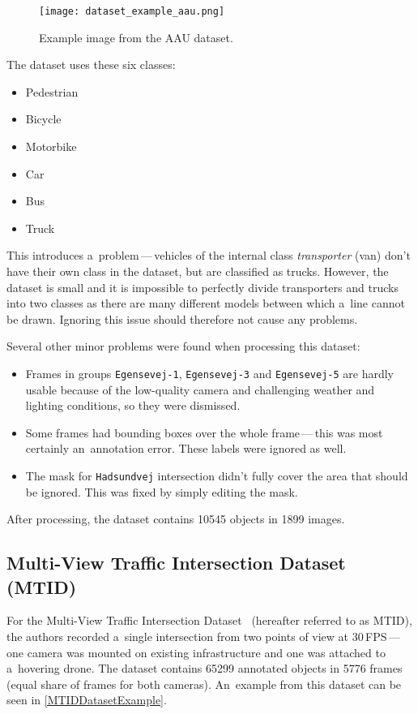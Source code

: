 \begin{figure}[t]
    \centering
    \texttt{[image: dataset\_example\_aau.png]}
    \captionsetup{width=0.7\textwidth}
    \caption{Example image from the AAU dataset.}
    \label{AAUDatasetExample}
\end{figure}

The dataset uses these six classes:
\begin{itemize}
    \item Pedestrian
    \item Bicycle
    \item Motorbike
    \item Car
    \item Bus
    \item Truck
\end{itemize}
This introduces a~problem\,---\,vehicles of the internal class \textit{transporter}
(van) don't have their own class in the dataset, but are classified as trucks.
However, the dataset is small and it is impossible to perfectly divide
transporters and trucks into two classes as there are many different models
between which a~line cannot be drawn.  Ignoring this issue should therefore not
cause any problems.

Several other minor problems were found when processing this dataset:
\begin{itemize}
    \item Frames in groups \verb|Egensevej-1|, \verb|Egensevej-3| and
    \verb|Egensevej-5| are hardly usable because of the low-quality camera and
    challenging weather and lighting conditions, so they were dismissed.
    \item Some frames had bounding boxes over the whole frame\,---\,this was most
    certainly an~annotation error. These labels were ignored as well.
    \item The mask for \verb|Hadsundvej| intersection didn't fully cover the
    area that should be ignored. This was fixed by simply editing the mask.
\end{itemize}

After processing, the dataset contains \num{10545} objects in \num{1899} images.


\subsection{Multi-View Traffic Intersection Dataset (MTID)}

For the Multi-View Traffic Intersection Dataset~\cite{Jensen2020} (hereafter referred to as MTID), the
authors recorded a~single intersection from two points of view at 30\,FPS\,---\,one
camera was mounted on existing infrastructure and one was attached to a~hovering
drone. The dataset contains \num{65299} annotated objects in \num{5776} frames
(equal share of frames for both cameras). An~example from this dataset can be
seen in \autoref{MTIDDatasetExample}.

